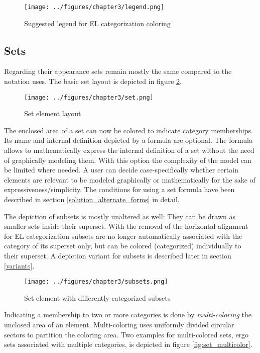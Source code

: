 \documentclass[twoside, openright, 12pt]{book}
\begin{document}
\begin{figure}[htb]
	\centering
	\texttt{[image: ../figures/chapter3/legend.png]}
	\caption{Suggested legend for EL categorization coloring}
	\label{fig:legend}
\end{figure}



\subsection{Sets}
Regarding their appearance sets remain mostly the same compared to the notation \cite{Amthor18} uses.
The basic set layout is depicted in figure \ref{fig:set}.

\begin{figure}[htb]
	\centering
	\texttt{[image: ../figures/chapter3/set.png]}
	\caption{Set element layout}
	\label{fig:set}
\end{figure}

\noindent
The enclosed area of a set can now be colored to indicate category memberships.
Its name and internal definition depicted by a formula are optional.
The formula allows to mathematically express the internal definition of a set without the need of graphically modeling them.
With this option the complexity of the model can be limited where needed.
A user can decide case-specifically whether certain elements are relevant to be modeled graphically or mathematically for the sake of expressiveness/simplicity.
The conditions for using a set formula have been described in section \ref{solution_alternate_forms} in detail.

The depiction of subsets is mostly unaltered as well: They can be drawn as smaller sets inside their superset.
With the removal of the horizontal alignment for EL categorization subsets are no longer automatically associated with the category of its superset only, but can be colored (categorized) individually to their superset.
A depiction variant for subsets is described later in section \ref{variants}.

\begin{figure}[htb]
	\centering
	\texttt{[image: ../figures/chapter3/subsets.png]}
	\caption{Set element with differently categorized subsets}
	\label{fig:subsets}
\end{figure}

\noindent
Indicating a membership to two or more categories is done by \textit{multi-coloring} the unclosed area of an element.
Multi-coloring uses uniformly divided circular sectors to partition the coloring area.
Two examples for multi-colored sets, ergo sets associated with multiple categories, is depicted in figure \ref{fig:set_multicolor}.
\end{document}
